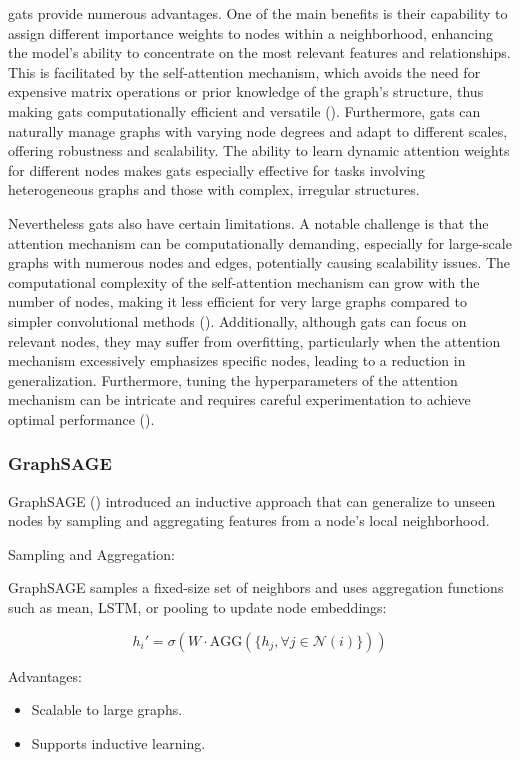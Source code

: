 \glspl{gat} provide numerous advantages.
One of the main benefits is their capability to assign different importance weights to nodes within a neighborhood, enhancing the model's ability to concentrate on the most relevant features and relationships.
This is facilitated by the self-attention mechanism, which avoids the need for expensive matrix operations or prior knowledge of the graph's structure, thus making \glspl{gat} computationally efficient and versatile (\cite{Velickovic2018}).
Furthermore, \glspl{gat} can naturally manage graphs with varying node degrees and adapt to different scales, offering robustness and scalability.
The ability to learn dynamic attention weights for different nodes makes \glspl{gat} especially effective for tasks involving heterogeneous graphs and those with complex, irregular structures.

Nevertheless \glspl{gat} also have certain limitations.
A notable challenge is that the attention mechanism can be computationally demanding, especially for large-scale graphs with numerous nodes and edges, potentially causing scalability issues.
The computational complexity of the self-attention mechanism can grow with the number of nodes, making it less efficient for very large graphs compared to simpler convolutional methods (\cite{Thekumparampil2018}).
Additionally, although \glspl{gat} can focus on relevant nodes, they may suffer from overfitting, particularly when the attention mechanism excessively emphasizes specific nodes, leading to a reduction in generalization.
Furthermore, tuning the hyperparameters of the attention mechanism can be intricate and requires careful experimentation to achieve optimal performance (\cite{Lee2018}).

\subsubsection*{GraphSAGE}

GraphSAGE (\cite{Hamilton2017}) introduced an inductive approach that can generalize to unseen nodes by sampling and aggregating features from a node's local neighborhood.

Sampling and Aggregation:

GraphSAGE samples a fixed-size set of neighbors and uses aggregation functions such as mean, LSTM, or pooling to update node embeddings:

\[ h_i' = \sigma\left(W \cdot \text{AGG}\left(\{h_j, \forall j \in \mathcal{N}(i)\}\right)\right) \]

Advantages:
\begin{itemize}
    \item Scalable to large graphs.
    \item Supports inductive learning.
\end{itemize}


